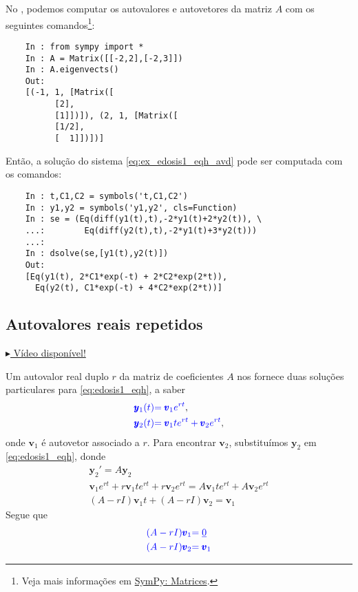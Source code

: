 \begin{ex}
  \ifispython
  No \python, podemos computar os autovalores e autovetores da matriz $A$ com os seguintes comandos\footnote{Veja mais informações em \href{https://docs.sympy.org/latest/tutorial/matrices.html}{SymPy: Matrices}.}:
  \begin{lstlisting}
    In : from sympy import *
    In : A = Matrix([[-2,2],[-2,3]])
    In : A.eigenvects()
    Out: 
    [(-1, 1, [Matrix([
          [2],
          [1]])]), (2, 1, [Matrix([
          [1/2],
          [  1]])])]
  \end{lstlisting}

  Então, a solução do sistema \eqref{eq:ex_edosis1_eqh_avd} pode ser computada com os comandos:
  \begin{lstlisting}
    In : t,C1,C2 = symbols('t,C1,C2')
    In : y1,y2 = symbols('y1,y2', cls=Function)
    In : se = (Eq(diff(y1(t),t),-2*y1(t)+2*y2(t)), \
    ...:        Eq(diff(y2(t),t),-2*y1(t)+3*y2(t)))
    ...: 
    In : dsolve(se,[y1(t),y2(t)])
    Out: 
    [Eq(y1(t), 2*C1*exp(-t) + 2*C2*exp(2*t)),
      Eq(y2(t), C1*exp(-t) + 4*C2*exp(2*t))]
  \end{lstlisting}
  \fi
\end{ex}

\subsection{Autovalores reais repetidos}\label{subsec:edosis1_eqh_avr}

\begin{flushright}
  \href{https://archive.org/details/sistema-edos-autovalres-repetidos}{$\blacktriangleright$ Vídeo disponível!}
\end{flushright}

Um autovalor real duplo $r$ da matriz de coeficientes $A$ nos fornece duas soluções particulares para \eqref{eq:edosis1_eqh}, a saber
\begin{align}
  {\color{blue}\pmb{y}_1(t)} &{\color{blue}= \pmb{v}_1e^{rt}},\\
  {\color{blue}\pmb{y}_2(t)} &{\color{blue}= \pmb{v}_1te^{rt} + \pmb{v}_2e^{rt}},
\end{align}
onde $\pmb{v}_1$ é autovetor associado a $r$. Para encontrar $\pmb{v}_2$, substituímos $\pmb{y}_2$ em \eqref{eq:edosis1_eqh}, donde
\begin{gather}
  \pmb{y}_2' = A\pmb{y}_2 \\
  \pmb{v}_1e^{rt} + r\pmb{v}_1te^{rt} + r\pmb{v}_2e^{rt} = A\pmb{v}_1te^{rt} + A\pmb{v}_2e^{rt} \\
  (A-rI)\pmb{v}_1t + (A-rI)\pmb{v}_2 = \pmb{v}_1
\end{gather}
Segue que
\begin{align}
  {\color{blue}(A-rI)\pmb{v}_1} &{\color{blue}= \underline{0}} \\
  {\color{blue}(A-rI)\pmb{v}_2} &{\color{blue}= \pmb{v}_1}
\end{align}

